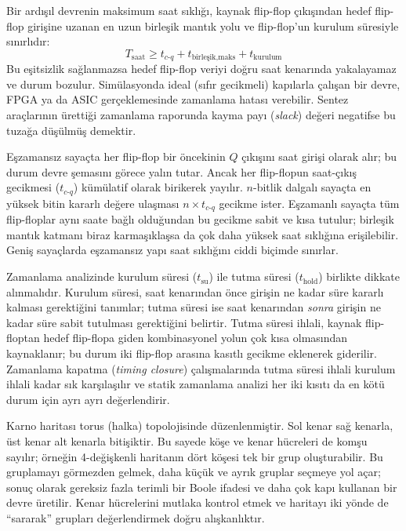 Bir ardışıl devrenin maksimum saat sıklığı, kaynak flip-flop çıkışından hedef flip-flop girişine uzanan en uzun birleşik mantık yolu ve flip-flop'un kurulum süresiyle sınırlıdır:
\[
T_{\text{saat}} \geq t_{c\text{-}q} + t_{\text{birleşik,maks}} + t_{\text{kurulum}}
\]
Bu eşitsizlik sağlanmazsa hedef flip-flop veriyi doğru saat kenarında yakalayamaz ve durum bozulur. Simülasyonda ideal (sıfır gecikmeli) kapılarla çalışan bir devre, FPGA ya da ASIC gerçeklemesinde zamanlama hatası verebilir. Sentez araçlarının ürettiği zamanlama raporunda kayma payı (\emph{slack}) değeri negatifse bu tuzağa düşülmüş demektir.

Eşzamansız sayaçta her flip-flop bir öncekinin $Q$ çıkışını saat girişi olarak alır; bu durum devre şemasını görece yalın tutar. Ancak her flip-flopun saat-çıkış gecikmesi ($t_{c\text{-}q}$) kümülatif olarak birikerek yayılır. $n$-bitlik dalgalı sayaçta en yüksek bitin kararlı değere ulaşması $n \times t_{c\text{-}q}$ gecikme ister. Eşzamanlı sayaçta tüm flip-floplar aynı saate bağlı olduğundan bu gecikme sabit ve kısa tutulur; birleşik mantık katmanı biraz karmaşıklaşsa da çok daha yüksek saat sıklığına erişilebilir. Geniş sayaçlarda eşzamansız yapı saat sıklığını ciddi biçimde sınırlar.

Zamanlama analizinde kurulum süresi ($t_{\text{su}}$) ile tutma süresi ($t_{\text{hold}}$) birlikte dikkate alınmalıdır. Kurulum süresi, saat kenarından önce girişin ne kadar süre kararlı kalması gerektiğini tanımlar; tutma süresi ise saat kenarından \emph{sonra} girişin ne kadar süre sabit tutulması gerektiğini belirtir. Tutma süresi ihlali, kaynak flip-floptan hedef flip-flopa giden kombinasyonel yolun çok kısa olmasından kaynaklanır; bu durum iki flip-flop arasına kasıtlı gecikme eklenerek giderilir. Zamanlama kapatma (\emph{timing closure}) çalışmalarında tutma süresi ihlali kurulum ihlali kadar sık karşılaşılır ve statik zamanlama analizi her iki kısıtı da en kötü durum için ayrı ayrı değerlendirir.

Karno haritası torus (halka) topolojisinde düzenlenmiştir. Sol kenar sağ kenarla, üst kenar alt kenarla bitişiktir. Bu sayede köşe ve kenar hücreleri de komşu sayılır; örneğin 4-değişkenli haritanın dört köşesi tek bir grup oluşturabilir. Bu gruplamayı görmezden gelmek, daha küçük ve ayrık gruplar seçmeye yol açar; sonuç olarak gereksiz fazla terimli bir Boole ifadesi ve daha çok kapı kullanan bir devre üretilir. Kenar hücrelerini mutlaka kontrol etmek ve haritayı iki yönde de ``sararak'' grupları değerlendirmek doğru alışkanlıktır.

